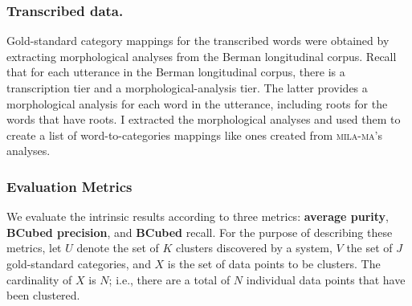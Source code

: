 \subsubsection{Transcribed data.} Gold-standard category mappings for the 
transcribed words were obtained by extracting morphological analyses from the Berman 
longitudinal corpus. Recall that for each utterance in the Berman longitudinal corpus, 
there is a transcription tier and a morphological-analysis tier. The latter provides a 
morphological analysis for each word in the utterance, including roots for the words 
that have roots. I extracted the morphological analyses and used them to create a list of 
word-to-categories mappings like ones created from \textsc{mila-ma}'s analyses.
\subsubsection{Evaluation Metrics} 
\label{sec:metrics}
We evaluate the intrinsic results according to three metrics: \textbf{average purity}, \textbf{BCubed precision}, and
 \textbf{BCubed} recall. For the purpose of describing these metrics,
 let $U$ denote the set of $K$ clusters discovered by a system, $V$ the set of $J$ gold-standard categories, and $X$ is the set of data points to be clusters. The cardinality of $X$ is $N$; i.e., there are a total of $N$ individual data points that have been clustered.
